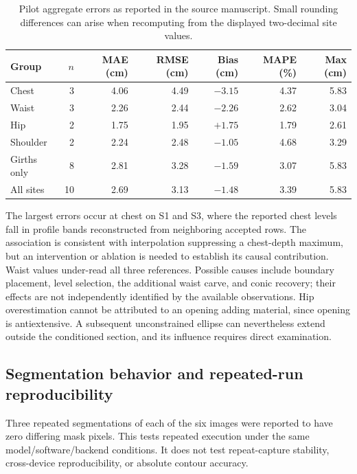 \documentclass[11pt,a4paper]{article}
\numberwithin{equation}{section}
\begin{document}
\begin{table}[htbp]
\centering\small
\caption{Pilot aggregate errors as reported in the source manuscript. Small rounding differences can arise when recomputing from the displayed two-decimal site values.}
\label{tab:aggregate_error}
\begin{tabular}{lrrrrrr}
\toprule
Group & $n$ & MAE (cm) & RMSE (cm) & Bias (cm) & MAPE (\%) & Max (cm) \\
\midrule
Chest & 3 & 4.06 & 4.49 & $-3.15$ & 4.37 & 5.83 \\
Waist & 3 & 2.26 & 2.44 & $-2.26$ & 2.62 & 3.04 \\
Hip & 2 & 1.75 & 1.95 & $+1.75$ & 1.79 & 2.61 \\
Shoulder & 2 & 2.24 & 2.48 & $-1.05$ & 4.68 & 3.29 \\
Girths only & 8 & 2.81 & 3.28 & $-1.59$ & 3.07 & 5.83 \\
All sites & 10 & 2.69 & 3.13 & $-1.48$ & 3.39 & 5.83 \\
\bottomrule
\end{tabular}
\end{table}

The largest errors occur at chest on S1 and S3, where the reported chest levels fall in profile bands reconstructed from neighboring accepted rows. The association is consistent with interpolation suppressing a chest-depth maximum, but an intervention or ablation is needed to establish its causal contribution. Waist values under-read all three references. Possible causes include boundary placement, level selection, the additional waist carve, and conic recovery; their effects are not independently identified by the available observations. Hip overestimation cannot be attributed to an opening adding material, since opening is antiextensive. A subsequent unconstrained ellipse can nevertheless extend outside the conditioned section, and its influence requires direct examination.

\subsection{Segmentation behavior and repeated-run reproducibility}
Three repeated segmentations of each of the six images were reported to have zero differing mask pixels. This tests repeated execution under the same model/software/backend conditions. It does not test repeat-capture stability, cross-device reproducibility, or absolute contour accuracy.
\end{document}

